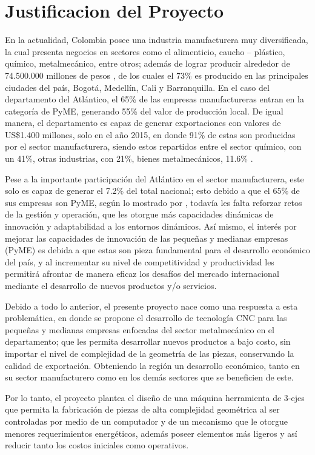 \section{Justificacion del Proyecto}
    En la actualidad, Colombia posee una industria manufacturera muy diversificada, la cual presenta negocios en sectores como el alimenticio, caucho – plástico, químico, metalmecánico, entre otros; además de lograr producir alrededor de 74.500.000 millones de pesos \citep{DANE2015}, de los cuales el 73\% es producido en las principales ciudades del país, Bogotá, Medellín, Cali y Barranquilla. En el caso del departamento del Atlántico, el 65\% de las empresas manufactureras entran en la categoría de PyME, generando 55\% del valor de producción local. De igual manera, el departamento es capaz de generar exportaciones con valores de US\$1.400 millones, solo en el año 2015, en donde 91\% de estas son producidas por el sector manufacturera, siendo estos repartidos entre el sector químico, con un 41\%, otras industrias, con 21\%, bienes metalmecánicos, 11.6\% \citep{lechuga2018analisis}.
    
    Pese a la importante participación del Atlántico en el sector manufacturera, este solo es capaz de generar el 7.2\% del total nacional; esto debido a que el 65\% de sus empresas son PyME, según lo mostrado por \cite{camargo2017capacidad}, todavía les falta reforzar retos de la gestión y operación, que les otorgue más capacidades dinámicas de innovación y adaptabilidad a los entornos dinámicos. Así mismo, el interés por mejorar las capacidades de innovación de las pequeñas y medianas empresas (PyME) es debida a que estas son pieza fundamental para el desarrollo económico del país, y al incrementar su nivel de competitividad y productividad les permitirá afrontar de manera eficaz los desafíos del mercado internacional mediante el desarrollo de nuevos productos y/o servicios.
    
    Debido a todo lo anterior, el presente proyecto nace como una respuesta a esta problemática, en donde se propone el desarrollo de tecnología CNC para las pequeñas y medianas empresas enfocadas del sector metalmecánico en el departamento; que les permita desarrollar nuevos productos a bajo costo, sin importar el nivel de complejidad de la geometría de las piezas, conservando la calidad de exportación. Obteniendo la región un desarrollo económico, tanto en su sector manufacturero como en los demás sectores que se beneficien de este. 
    
    Por lo tanto, el proyecto plantea el diseño de una máquina herramienta de 3-ejes que permita la fabricación de piezas de alta complejidad geométrica al ser controladas por medio de un computador y de un mecanismo que le otorgue menores requerimientos energéticos, además poseer elementos más ligeros y así reducir tanto los costos iniciales como operativos.
    
